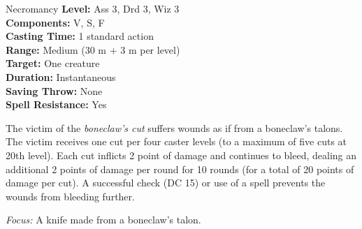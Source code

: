 {Necromancy}
{
	\textbf{Level:}
	Ass 3, Drd 3, Wiz 3\\
	\textbf{Components:}
	V, S, F\\
	\textbf{Casting Time:}
	1 standard action\\
	\textbf{Range:}
	Medium (30 m + 3 m per level)\\
	\textbf{Target:}
	One creature\\
	\textbf{Duration:}
	Instantaneous\\
	\textbf{Saving Throw:}
	None\\
	\textbf{Spell Resistance:}
	Yes\\
}
{
	The victim of the \emph{boneclaw's cut} suffers wounds as if from a boneclaw's talons. The victim receives one cut per four caster levels (to a maximum of five cuts at 20th level). Each cut inflicts 2 point of damage and continues to bleed, dealing an additional 2 points of damage per round for 10 rounds (for a total of 20 points of damage per cut). A successful  check (DC 15) or use of a  spell prevents the wounds from bleeding further.

	\textit{Focus:} A knife made from a boneclaw's talon.
}
